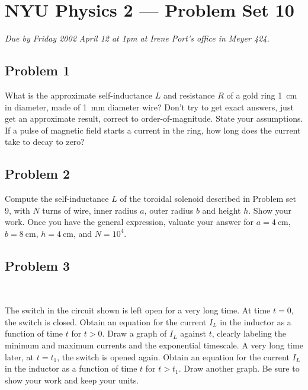 \documentclass{article}
\begin{document}
\thispagestyle{empty}
\section*{NYU Physics 2 --- Problem Set 10}

\emph{Due by Friday 2002 April 12 at 1pm at Irene Port's office in
Meyer 424.}

\subsection*{Problem 1}

What is the approximate self-inductance $L$ and resistance $R$ of a
gold ring 1~cm in diameter, made of 1~mm diameter wire?  Don't try to
get exact answers, just get an approximate result, correct to
order-of-magnitude.  State your assumptions.  If a pulse of magnetic
field starts a current in the ring, how long does the current take to
decay to zero?

\subsection*{Problem 2}

Compute the self-inductance $L$ of the toroidal solenoid described in
Problem set 9, with $N$ turns of wire, inner radius $a$, outer radius
$b$ and height $h$.  Show your work.  Once you have the general
expression, valuate your answer for $a=4~\mathrm{cm}$,
$b=8~\mathrm{cm}$, $h=4~\mathrm{cm}$, and $N=10^4$.

\subsection*{Problem 3}

\noindent
~\hfill{}\hfill~

The switch in the circuit shown is left open for a very long time.  At
time $t=0$, the switch is closed.  Obtain an equation for the current
$I_L$ in the inductor as a function of time $t$ for $t>0$.  Draw a
graph of $I_L$ against $t$, clearly labeling the minimum and maximum
currents and the exponential timescale.  A very long time later, at
$t=t_1$, the switch is opened again.  Obtain an equation for the
current $I_L$ in the inductor as a function of time $t$ for $t>t_1$.
Draw another graph.  Be sure to show your work and keep your units.
\end{document}
